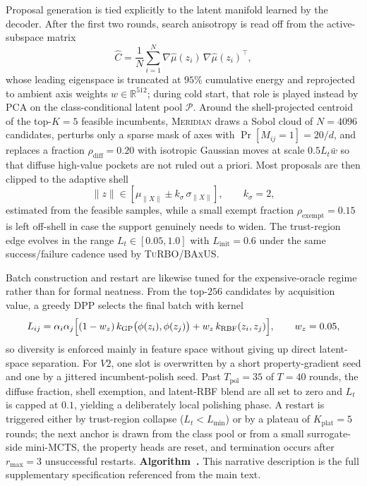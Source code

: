 \documentclass{article}
\newcommand{\meridian}{\textsc{Meridian}}
\newcommand{\turbo}{\textsc{TuRBO}}
\newcommand{\baxus}{\textsc{BAxUS}}
\newcommand{\R}{\mathbb{R}}
\begin{document}
Proposal generation is tied explicitly to the latent manifold learned by the decoder. After the first two rounds, search anisotropy is read off from the active-subspace matrix
\begin{equation}
  \hat C = \frac{1}{N}\sum_{i=1}^{N} \nabla \hat\mu(z_i)\, \nabla \hat\mu(z_i)^\top,
\end{equation}
whose leading eigenspace is truncated at $95\%$ cumulative energy and reprojected to ambient axis weights $w\in\R^{512}$; during cold start, that role is played instead by PCA on the class-conditional latent pool $\mathcal P$. Around the shell-projected centroid of the top-$K{=}5$ feasible incumbents, \meridian{} draws a Sobol cloud of $N{=}4096$ candidates, perturbs only a sparse mask of axes with $\Pr[M_{ij}{=}1]=20/d$, and replaces a fraction $\rho_{\mathrm{diff}}{=}0.20$ with isotropic Gaussian moves at scale $0.5L_t\bar w$ so that diffuse high-value pockets are not ruled out a priori. Most proposals are then clipped to the adaptive shell
\begin{equation}
  \|z\| \in [\mu_{\|X\|} \pm k_\sigma \, \sigma_{\|X\|}],
  \qquad k_\sigma = 2,
\end{equation}
estimated from the feasible samples, while a small exempt fraction $\rho_{\mathrm{exempt}}{=}0.15$ is left off-shell in case the support genuinely needs to widen. The trust-region edge evolves in the range $L_t\in[0.05,1.0]$ with $L_{\mathrm{init}}{=}0.6$ under the same success/failure cadence used by \turbo{}/\baxus{}.

Batch construction and restart are likewise tuned for the expensive-oracle regime rather than for formal neatness. From the top-$256$ candidates by acquisition value, a greedy DPP selects the final batch with kernel
\begin{equation}
  L_{ij} = \alpha_i\alpha_j\Bigl[(1-w_z) \, k_{\mathrm{GP}}\bigl(\phi(z_i),\phi(z_j)\bigr) + w_z \, k_{\mathrm{RBF}}(z_i,z_j)\Bigr],
  \qquad w_z = 0.05,
\end{equation}
so diversity is enforced mainly in feature space without giving up direct latent-space separation. For $V2$, one slot is overwritten by a short property-gradient seed and one by a jittered incumbent-polish seed. Past $T_{\mathrm{pol}}{=}35$ of $T{=}40$ rounds, the diffuse fraction, shell exemption, and latent-RBF blend are all set to zero and $L_t$ is capped at $0.1$, yielding a deliberately local polishing phase. A restart is triggered either by trust-region collapse ($L_t<L_{\min}$) or by a plateau of $K_{\mathrm{plat}}{=}5$ rounds; the next anchor is drawn from the class pool or from a small surrogate-side mini-MCTS, the property heads are reset, and termination occurs after $r_{\max}{=}3$ unsuccessful restarts. \label{alg:meridian-full}\noindent\textbf{Algorithm~\thealgorithm.} This narrative description is the full supplementary specification referenced from the main text.
\end{document}
